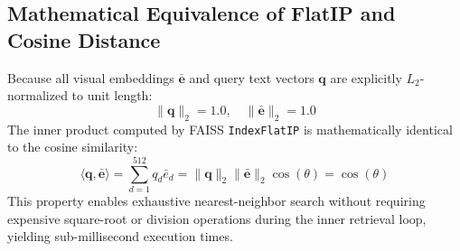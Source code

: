 \documentclass[12pt,a4paper]{article}
\begin{document}
\subsection{Mathematical Equivalence of FlatIP and Cosine Distance}
Because all visual embeddings $\bar{\mathbf{e}}$ and query text vectors $\mathbf{q}$ are explicitly $L_2$-normalized to unit length:
\begin{equation}
\|\mathbf{q}\|_2 = 1.0, \quad \|\bar{\mathbf{e}}\|_2 = 1.0
\end{equation}
The inner product computed by FAISS \texttt{IndexFlatIP} is mathematically identical to the cosine similarity:
\begin{equation}
\langle \mathbf{q}, \bar{\mathbf{e}} \rangle = \sum_{d=1}^{512} q_d \bar{e}_d = \|\mathbf{q}\|_2 \|\bar{\mathbf{e}}\|_2 \cos(\theta) = \cos(\theta)
\end{equation}
This property enables exhaustive nearest-neighbor search without requiring expensive square-root or division operations during the inner retrieval loop, yielding sub-millisecond execution times.
\end{document}
